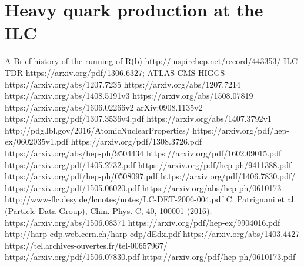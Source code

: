 \documentclass[a4paper]{article}
\begin{document}
\part{Heavy quark production at the ILC}


% 
\begin{thebibliography}{100} 
 A Brief history of the running of R(b) http://inspirehep.net/record/443353/
 ILC TDR https://arxiv.org/pdf/1306.6327;
 ATLAS CMS HIGGS 
https://arxiv.org/abs/1207.7235
 https://arxiv.org/abs/1207.7214
  https://arxiv.org/abs/1408.5191v3
 https://arxiv.org/abs/1508.07819
 https://arxiv.org/abs/1606.02266v2
  arXiv:0908.1135v2
 https://arxiv.org/pdf/1307.3536v4.pdf
 https://arxiv.org/abs/1407.3792v1
 http://pdg.lbl.gov/2016/AtomicNuclearProperties/
 https://arxiv.org/pdf/hep-ex/0602035v1.pdf
https://arxiv.org/pdf/1308.3726.pdf
 https://arxiv.org/abs/hep-ph/9504434
 https://arxiv.org/pdf/1602.09015.pdf
 https://arxiv.org/pdf/1405.2732.pdf
 https://arxiv.org/pdf/hep-ph/9411388.pdf
https://arxiv.org/pdf/hep-ph/0508097.pdf
 https://arxiv.org/pdf/1406.7830.pdf/
https://arxiv.org/pdf/1505.06020.pdf
https://arxiv.org/abs/hep-ph/0610173
http://www-flc.desy.de/lcnotes/notes/LC-DET-2006-004.pdf
C. Patrignani et al. (Particle Data Group), Chin. Phys. C, 40, 100001 (2016).
 https://arxiv.org/abs/1506.08371
 https://arxiv.org/pdf/hep-ex/9904016.pdf
 http://harp-cdp.web.cern.ch/harp-cdp/dEdx.pdf
 https://arxiv.org/abs/1403.4427
 https://tel.archives-ouvertes.fr/tel-00657967/
https://arxiv.org/pdf/1506.07830.pdf
https://arxiv.org/pdf/hep-ph/0610173.pdf
\end{thebibliography}
\end{document}
